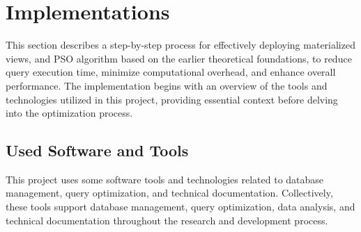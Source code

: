 
\section{Implementations}
This section describes a step-by-step process for effectively deploying materialized views, and PSO algorithm based on the earlier theoretical foundations, to reduce query execution time, minimize computational overhead, and enhance overall performance. The implementation begins with an overview of the tools and technologies utilized in this project, providing essential context before delving into the optimization process.

\subsection{Used Software and Tools}
This project uses some software tools and technologies related to database management, query optimization, and technical documentation. Collectively, these tools support database management, query optimization, data analysis, and technical documentation throughout the research and development process.

